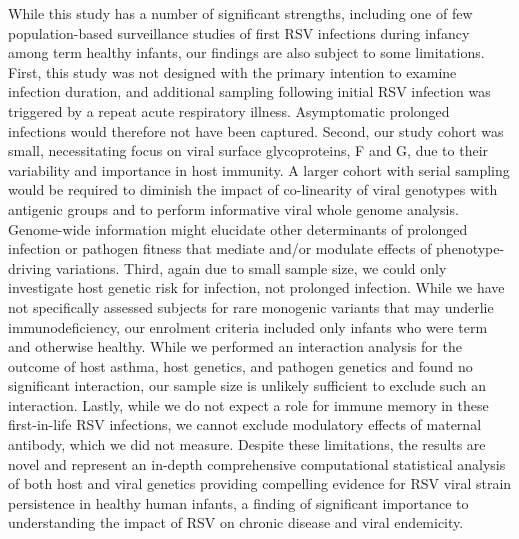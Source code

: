 \documentclass{article} %
\begin{document}
While this study has a number of significant strengths, including one of few population-based surveillance studies of first RSV infections during infancy among term healthy infants, our findings are also subject to some limitations. First, this study was not designed with the primary intention to examine infection duration, and additional sampling following initial RSV infection was triggered by a repeat acute respiratory illness. Asymptomatic prolonged infections would therefore not have been captured. Second, our study cohort was small, necessitating focus on viral surface glycoproteins, F and G, due to their variability and importance in host immunity. A larger cohort with serial sampling would be required to diminish the impact of co-linearity of viral genotypes with antigenic groups and to perform informative viral whole genome analysis. Genome-wide information might elucidate other determinants of prolonged infection or pathogen fitness that mediate and/or modulate effects of phenotype-driving variations. Third, again due to small sample size, we could only investigate host genetic risk for infection, not prolonged infection. While we have not specifically assessed subjects for rare monogenic variants that may underlie immunodeficiency, our enrolment criteria included only infants who were term and otherwise healthy. While we performed an interaction analysis for the outcome of host asthma, host genetics, and pathogen genetics and found no significant interaction, our sample size is unlikely sufficient to exclude such an interaction. Lastly, while we do not expect a role for immune memory in these first-in-life RSV infections, we cannot exclude modulatory effects of maternal antibody, which we did not measure. Despite these limitations, the results are novel and represent an in-depth comprehensive computational statistical analysis of both host and viral genetics providing compelling evidence for RSV viral strain persistence in healthy human infants, a finding of significant importance to understanding the impact of RSV on chronic disease and viral endemicity. 
  
\end{document}
